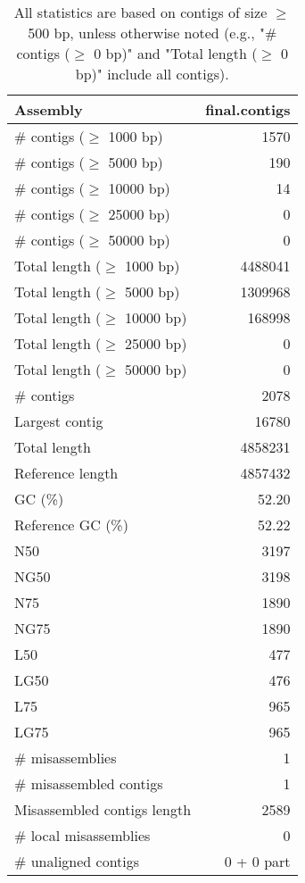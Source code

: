 \documentclass[12pt,a4paper]{article}
\begin{document}
\begin{table}[ht]
\begin{center}
\caption{All statistics are based on contigs of size $\geq$ 500 bp, unless otherwise noted (e.g., "\# contigs ($\geq$ 0 bp)" and "Total length ($\geq$ 0 bp)" include all contigs).}
\begin{tabular}{|l*{1}{|r}|}
\hline
Assembly & final.contigs \\ \hline
\# contigs ($\geq$ 1000 bp) & 1570 \\ \hline
\# contigs ($\geq$ 5000 bp) & 190 \\ \hline
\# contigs ($\geq$ 10000 bp) & 14 \\ \hline
\# contigs ($\geq$ 25000 bp) & 0 \\ \hline
\# contigs ($\geq$ 50000 bp) & 0 \\ \hline
Total length ($\geq$ 1000 bp) & 4488041 \\ \hline
Total length ($\geq$ 5000 bp) & 1309968 \\ \hline
Total length ($\geq$ 10000 bp) & 168998 \\ \hline
Total length ($\geq$ 25000 bp) & 0 \\ \hline
Total length ($\geq$ 50000 bp) & 0 \\ \hline
\# contigs & 2078 \\ \hline
Largest contig & 16780 \\ \hline
Total length & 4858231 \\ \hline
Reference length & 4857432 \\ \hline
GC (\%) & 52.20 \\ \hline
Reference GC (\%) & 52.22 \\ \hline
N50 & 3197 \\ \hline
NG50 & 3198 \\ \hline
N75 & 1890 \\ \hline
NG75 & 1890 \\ \hline
L50 & 477 \\ \hline
LG50 & 476 \\ \hline
L75 & 965 \\ \hline
LG75 & 965 \\ \hline
\# misassemblies & 1 \\ \hline
\# misassembled contigs & 1 \\ \hline
Misassembled contigs length & 2589 \\ \hline
\# local misassemblies & 0 \\ \hline
\# unaligned contigs & 0 + 0 part \\ \hline

\end{tabular}
\end{center}
\end{table}
\end{document}

